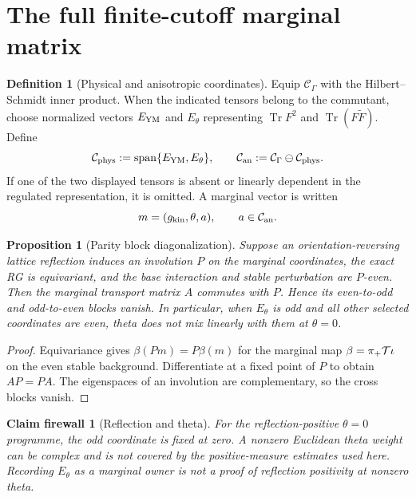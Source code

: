 \documentclass[11pt,oneside]{book}
\newtheorem{proposition}[theorem]{Proposition}
\newtheorem{firewall}[theorem]{Claim firewall}
\theoremstyle{definition}
\newtheorem{definition}[theorem]{Definition}
\theoremstyle{remark}
\begin{document}
\section{The full finite-cutoff marginal matrix}
\label{sec:e8v5-commutant}

\begin{definition}[Physical and anisotropic coordinates]
\label{def:e8v5-physical-coordinates}
Equip \({\mathcal C}_\Gamma\) with the Hilbert--Schmidt inner product.
When the indicated tensors belong to the commutant, choose normalized
vectors \(E_{\rm YM}\) and \(E_\theta\) representing
\(\operatorname{Tr}F^2\) and
\(\operatorname{Tr}(F\widetilde F)\).  Define
\[
 {\mathcal C}_{\rm phys}:=
 \operatorname{span}\{E_{\rm YM},E_\theta\},\qquad
 {\mathcal C}_{\rm an}:=
 {\mathcal C}_\Gamma\ominus{\mathcal C}_{\rm phys}. \label{eq:e8v5-Csplit}
\]
If one of the two displayed tensors is absent or linearly dependent
in the regulated representation, it is omitted.  A marginal vector
is written
\[
 m=(g_{\rm kin},\theta,a),\qquad
 a\in{\mathcal C}_{\rm an}.                          \label{eq:e8v5-mcoords}
\]
\end{definition}

\begin{proposition}[Parity block diagonalization]
\label{prop:e8v5-parity}
Suppose an orientation-reversing lattice reflection induces an
involution \(P\) on the marginal coordinates, the exact RG is
equivariant, and the base interaction and stable perturbation are
\(P\)-even.  Then the marginal transport matrix \(A\) commutes with
\(P\).  Hence its even-to-odd and odd-to-even blocks vanish.  In
particular, when \(E_\theta\) is odd and all other selected
coordinates are even, theta does not mix linearly with them at
\(\theta=0\).
\end{proposition}

\begin{proof}
Equivariance gives
\(\beta(Pm)=P\beta(m)\) for the marginal map
\(\beta=\pi_+{\cal T}\iota\) on the even stable background.
Differentiate at a fixed point of \(P\) to obtain \(AP=PA\).
The eigenspaces of an involution are complementary, so the cross
blocks vanish.
\end{proof}

\begin{firewall}[Reflection and theta]
\label{fire:e8v5-theta}
For the reflection-positive \(\theta=0\) programme, the odd
coordinate is fixed at zero.  A nonzero Euclidean theta weight can be
complex and is not covered by the positive-measure estimates used
here.  Recording \(E_\theta\) as a marginal owner is not a proof of
reflection positivity at nonzero theta.
\end{firewall}
\end{document}
